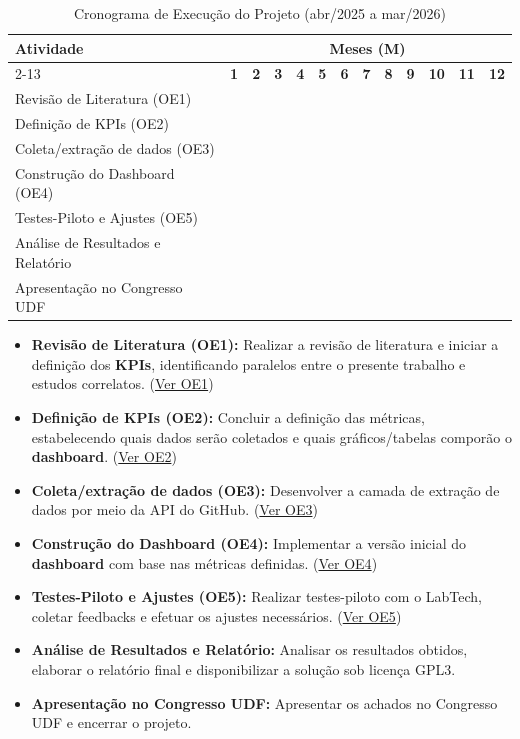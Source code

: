 \documentclass[
	12pt,           %
	openright,      %
	oneside,        %
	a4paper,        %
	brazil          %
]{abntex2}
\begin{document}
\newcommand{\X}{\textbullet}
\begin{table}[ht]
\begin{tabular}{|p{6cm}||c|c|c|c|c|c|c|c|c|c|c|c|}
\hline
\multirow{2}{*}{\textbf{Atividade}} & \multicolumn{12}{c|}{\textbf{Meses (M)}} \\
\cline{2-13}
 & \textbf{1} & \textbf{2} & \textbf{3} & \textbf{4} & \textbf{5} & \textbf{6} & \textbf{7} & \textbf{8} & \textbf{9} & \textbf{10} & \textbf{11} & \textbf{12} \\
\hline
Revisão de Literatura (OE1) & \X & \X &   &   &   &   &   &   &   &   &   &   \\
\hline
Definição de KPIs (OE2)    & \X & \X & \X &   &   &   &   &   &   &   &   &   \\
\hline
Coleta/extração de dados (OE3)  &   &   &   & \X & \X &   &   &   &   &   &   &   \\
\hline
Construção do Dashboard (OE4) &   &   &   &   & \X & \X &   &   &   &   &   &   \\
\hline
Testes-Piloto e Ajustes (OE5) &   &   &   &   &   &   & \X & \X & \X &   &   &   \\
\hline
Análise de Resultados e Relatório &   &   &   &   &   &   &   &   &   & \X & \X &   \\
\hline
Apresentação no Congresso UDF &   &   &   &   &   &   &   &   &   &   &   & \X \\
\hline
\end{tabular}
\centering
\caption{Cronograma de Execução do Projeto (abr/2025 a mar/2026)}
\label{tab:cronograma}
\end{table}

\begin{itemize}
    \item \textbf{Revisão de Literatura (OE1):} Realizar a revisão de literatura e iniciar a definição dos \textbf{KPIs}, identificando paralelos entre o presente trabalho e estudos correlatos. (\hyperref[OE1]{Ver OE1})
    \item \textbf{Definição de KPIs (OE2):} Concluir a definição das métricas, estabelecendo quais dados serão coletados e quais gráficos/tabelas comporão o \textbf{dashboard}. (\hyperref[OE2]{Ver OE2})
    \item \textbf{Coleta/extração de dados (OE3):} Desenvolver a camada de extração de dados por meio da API do GitHub. (\hyperref[OE3]{Ver OE3})
    \item \textbf{Construção do Dashboard (OE4):} Implementar a versão inicial do \textbf{dashboard} com base nas métricas definidas. (\hyperref[OE4]{Ver OE4})
    \item \textbf{Testes-Piloto e Ajustes (OE5):} Realizar testes-piloto com o LabTech, coletar feedbacks e efetuar os ajustes necessários. (\hyperref[OE5]{Ver OE5})
    \item \textbf{Análise de Resultados e Relatório:} Analisar os resultados obtidos, elaborar o relatório final e disponibilizar a solução sob licença GPL3.
    \item \textbf{Apresentação no Congresso UDF:} Apresentar os achados no Congresso UDF e encerrar o projeto.
\end{itemize}
\end{document}
